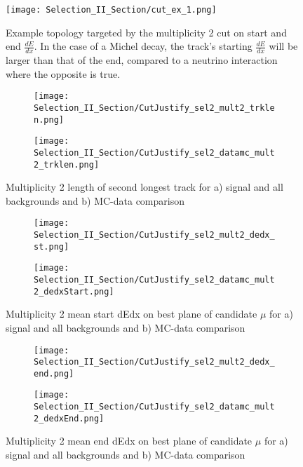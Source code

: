 \begin{figure}[h!]
  \centering
  \texttt{[image: Selection\_II\_Section/cut\_ex\_1.png]}
  \caption{Example topology targeted by the multiplicity 2 cut on start and end $\frac{dE}{dx}$.  In the case of a Michel decay, the track's starting $\frac{dE}{dx}$ will be larger than that of the end, compared to a neutrino interaction where the opposite is true. }
\label{fig:cut_ex_1}
\end{figure}

\begin{figure}[h!]
\centering
  \begin{subfigure}[t]{0.4\textwidth}
    \centering
    \texttt{[image: Selection\_II\_Section/CutJustify\_sel2\_mult2\_trklen.png]}
    \caption{ }
  \end{subfigure} 
  \hspace{20mm}
  \begin{subfigure}[t]{0.4\textwidth}
    \centering
    \texttt{[image: Selection\_II\_Section/CutJustify\_sel2\_datamc\_mult2\_trklen.png]}
    \caption{ }
  \end{subfigure} 

\caption{Multiplicity 2 length of second longest track for a) signal and all backgrounds and b) MC-data comparison }
\label{fig:cutjust_sel2_mult2_secondtrklen}
\end{figure}

\begin{figure}[h!]
\centering
  \begin{subfigure}[t]{0.4\textwidth}
    \centering
\texttt{[image: Selection\_II\_Section/CutJustify\_sel2\_mult2\_dedx\_st.png]}
    \caption{ }
  \end{subfigure} 
  \hspace{20mm}
  \begin{subfigure}[t]{0.4\textwidth}
    \centering
\texttt{[image: Selection\_II\_Section/CutJustify\_sel2\_datamc\_mult2\_dedxStart.png]}
    \caption{ }
  \end{subfigure} 
\caption{Multiplicity 2 mean start dEdx on best plane of candidate $\mu$ for a) signal and all backgrounds and b) MC-data comparison }
\label{fig:cutjust_sel2_mult2_dedxst}
\end{figure}

\begin{figure}[h!]
\centering
  \begin{subfigure}[t]{0.4\textwidth}
    \centering
\texttt{[image: Selection\_II\_Section/CutJustify\_sel2\_mult2\_dedx\_end.png]}
    \caption{ }
  \end{subfigure} 
  \hspace{20mm}
  \begin{subfigure}[t]{0.4\textwidth}
    \centering
\texttt{[image: Selection\_II\_Section/CutJustify\_sel2\_datamc\_mult2\_dedxEnd.png]}
  \caption{ }
  \end{subfigure} 
  
\caption{Multiplicity 2 mean end dEdx on best plane of candidate $\mu$ for a) signal and all backgrounds and b) MC-data comparison }
\label{fig:cutjust_sel2_mult2_dedxend}
\end{figure}

